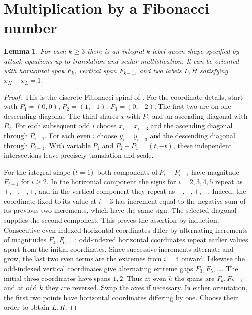 \documentclass[11pt]{article}
\newtheorem{lemma}[theorem]{Lemma}
\begin{document}
\section{Multiplication by a Fibonacci number}
\begin{lemma}\label{l:spiral}
For each $k\ge3$ there is an integral $k$-label queen shape specified by attack equations up to translation and scalar multiplication. It can be oriented with horizontal span $F_k$, vertical span $F_{k-1}$, and two labels $L,H$ satisfying $x_H-x_L=1$.
\end{lemma}
\begin{proof}
This is the discrete Fibonacci spiral of \cite[\S6]{chz}. For the coordinate details, start with $P_1=(0,0)$, $P_2=(1,-1)$, $P_3=(0,-2)$. The first two are on one descending diagonal. The third shares $x$ with $P_1$ and an ascending diagonal with $P_2$. For each subsequent odd $i$ choose $x_i=x_{i-3}$ and the ascending diagonal through $P_{i-1}$. For each even $i$ choose $y_i=y_{i-3}$ and the descending diagonal through $P_{i-1}$. With variable $P_1$ and $P_2-P_1=(t,-t)$, these independent intersections leave precisely translation and scale.

For the integral shape ($t=1$), both components of $P_i-P_{i-1}$ have magnitude $F_{i-1}$ for $i\ge2$. In the horizontal component the signs for $i=2,3,4,5$ repeat as $+,-,-,+$, and in the vertical component they repeat as $-,-,+,+$. Indeed, the coordinate fixed to its value at $i-3$ has increment equal to the negative sum of its previous two increments, which have the same sign. The selected diagonal supplies the second component. This proves the assertion by induction. Consecutive even-indexed horizontal coordinates differ by alternating increments of magnitudes $F_4,F_6,\dots$; odd-indexed horizontal coordinates repeat earlier values apart from the initial coordinates. Since successive increments alternate and grow, the last two even terms are the extremes from $i=4$ onward. Likewise the odd-indexed vertical coordinates give alternating extreme gaps $F_3,F_5,\dots$. The initial three coordinates have spans $1,2$. Thus at even $k$ the spans are $F_k,F_{k-1}$ and at odd $k$ they are reversed. Swap the axes if necessary. In either orientation, the first two points have horizontal coordinates differing by one. Choose their order to obtain $L,H$.
\end{proof}
\end{document}
